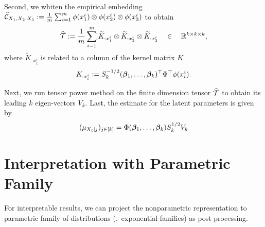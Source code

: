 \documentclass[11pt]{article}
\begin{document}
Second, we   whiten the empirical embedding $\widehat {\mathcal{C}}_{X_1,X_2,X_3}:=\frac{1}{m}\sum_{i=1}^m \phi(x_1^i) \otimes \phi(x_2^i) \otimes \phi(x_3^i)$ to obtain 
\begin{align}
	\widehat {{\mathcal{T}}} := \frac{1}{m}\sum_{i=1}^m \widetilde K_{:x_1^i} \otimes \widetilde K_{:x_2^i} \otimes \widetilde K_{:x_3^i} \quad \in \quad \mathbb{R}^{k\times k \times k},
\end{align}
where $\widetilde K_{:x_t^i}$ is related to a column of the kernel matrix $K$
$$
	K_{:x_t^i} := S_k^{-1/2} (\boldsymbol{\beta}_1,\ldots,\boldsymbol{\beta}_k)^\top \Phi^\top \phi(x_t^i).
$$

Next, we run tensor power method on the finite dimension tensor $\widehat {{\mathcal{T}}}$ to obtain its leading $k$ eigen-vectors $V_k$. Last, the estimate for the latent parameters is given by
\begin{align}
	(\mu_{X_t|j})_{j\in[k]} = \Phi (\boldsymbol{\beta}_1,\ldots,\boldsymbol{\beta}_k) S_k^{1/2} V_k
\end{align}

\section{Interpretation with Parametric Family}

For interpretable results, we can project the nonparametric representation to parametric family of distributions (\eg,~exponential families) as post-processing.




\end{document}
